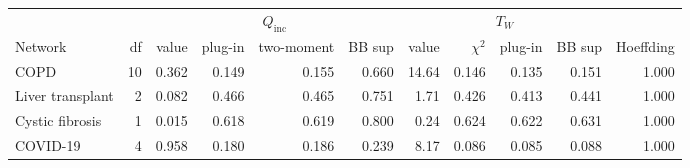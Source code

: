 \begin{tabular}{lrrrrrrrrrr}
\toprule
 & & \multicolumn{4}{c}{$Q_{\mathrm{inc}}$} & \multicolumn{4}{c}{$T_W$} & \\
\cmidrule(lr){3-6}\cmidrule(lr){7-10}
Network & df & value & plug-in & two-moment & BB sup & value & $\chi^2$ & plug-in & BB sup & Hoeffding \\
\midrule
COPD & 10 & 0.362 & 0.149 & 0.155 & 0.660 & 14.64 & 0.146 & 0.135 & 0.151 & 1.000 \\
Liver transplant & 2 & 0.082 & 0.466 & 0.465 & 0.751 & 1.71 & 0.426 & 0.413 & 0.441 & 1.000 \\
Cystic fibrosis & 1 & 0.015 & 0.618 & 0.619 & 0.800 & 0.24 & 0.624 & 0.622 & 0.631 & 1.000 \\
COVID-19 & 4 & 0.958 & 0.180 & 0.186 & 0.239 & 8.17 & 0.086 & 0.085 & 0.088 & 1.000 \\
\bottomrule
\end{tabular}
